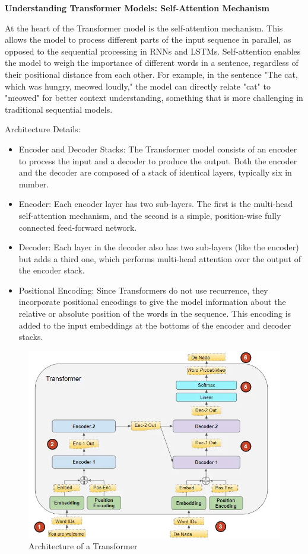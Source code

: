 \textbf{Understanding Transformer Models: Self-Attention Mechanism}

At the heart of the Transformer model is the self-attention mechanism. This allows the model to process different parts of the input sequence in parallel, as opposed to the sequential processing in RNNs and LSTMs. Self-attention enables the model to weigh the importance of different words in a sentence, regardless of their positional distance from each other. For example, in the sentence "The cat, which was hungry, meowed loudly," the model can directly relate "cat" to "meowed" for better context understanding, something that is more challenging in traditional sequential models.

Architecture Details:

\begin{itemize}
    \item Encoder and Decoder Stacks: The Transformer model consists of an encoder to process the input and a decoder to produce the output. Both the encoder and the decoder are composed of a stack of identical layers, typically six in number.
    \item Encoder: Each encoder layer has two sub-layers. The first is the multi-head self-attention mechanism, and the second is a simple, position-wise fully connected feed-forward network.
    \item Decoder: Each layer in the decoder also has two sub-layers (like the encoder) but adds a third one, which performs multi-head attention over the output of the encoder stack.
    \item Positional Encoding: Since Transformers do not use recurrence, they incorporate positional encodings to give the model information about the relative or absolute position of the words in the sequence. This encoding is added to the input embeddings at the bottoms of the encoder and decoder stacks.
\end{itemize}

\begin{figure}[h]
    \centering
    \includegraphics[width=0.8\linewidth]{img/chap04/transformer-arch.png}
    \caption{Architecture of a Transformer}
    \label{fig:transformer-arch}
\end{figure}

